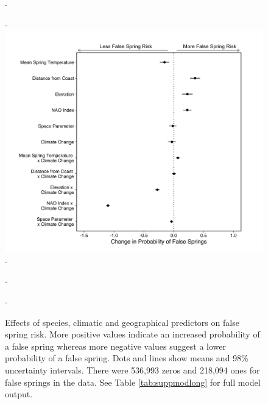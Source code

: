 \documentclass{article}\usepackage[]{graphicx}\usepackage[]{color}
\begin{document}
{\begin{figure} [H]
  -\begin{center}
  -\includegraphics[width=12cm]{..//..//analyses/figures/model_output_98_long.png}
  -\caption{Effects of species, climatic and geographical predictors on false spring risk. More positive values indicate an increased probability of a false spring whereas more negative values suggest a lower probability of a false spring. Dots and lines show means and 98\% uncertainty intervals. There were 536,993 zeros and 218,094 ones for false springs in the data. See Table \ref{tab:suppmodlong} for full model output.}\label{fig:maineffects}
  -\end{center}
  -\end{figure}}
  
\end{document}
